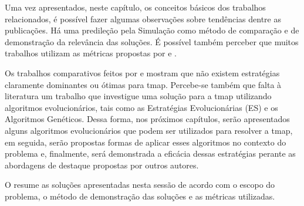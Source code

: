Uma vez apresentados, neste capítulo, os conceitos básicos dos trabalhos 
relacionados, é possível fazer algumas observações sobre tendências dentre as 
publicações. Há uma predileção pela Simulação como método de comparação e de 
demonstração da relevância das soluções. É possível também perceber que muitos 
trabalhos utilizam as métricas propostas por 
\citep{Machado:2002:MPE:1765317.1765332} e \citep{sampaiophd}.

Os trabalhos comparativos feitos por \citep{Almeida:2004:AAI} e 
\citep{sampaiophd} mostram que não existem estratégias claramente dominantes 
ou ótimas para \ac{tmap}. Percebe-se também que falta à literatura um trabalho 
que investigue uma solução para a \ac{tmap} utilizando algoritmos 
evolucionários, tais como as Estratégias Evolucionárias (ES) e os Algoritmos Genéticos. Dessa forma, nos próximos 
capítulos, serão apresentados alguns algoritmos evolucionários que podem ser 
utilizados para resolver a \ac{tmap}, em seguida, serão propostas formas de 
aplicar esses algoritmos no contexto do problema e, finalmente, será 
demonstrada a eficácia dessas estratégias perante as abordagens de destaque 
propostas por outros autores.

O  resume as soluções apresentadas nesta sessão de 
acordo com o escopo do problema, o método de demonstração das soluções e as 
métricas utilizadas.


